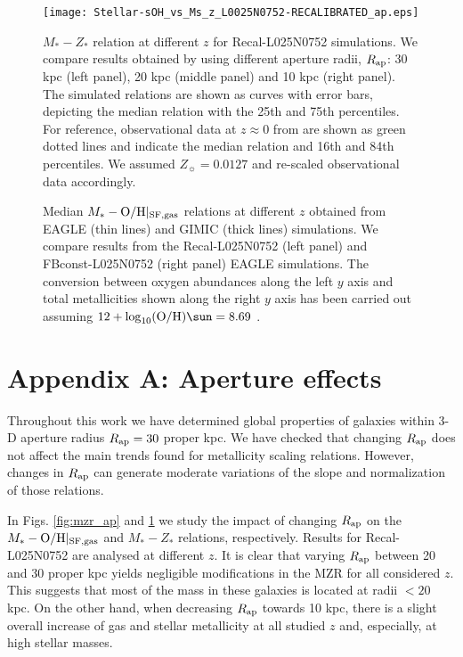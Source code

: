 \documentclass[useAMS,usenatbib]{mn2e}
\begin{document}
\begin{figure*}
\begin{center}
\resizebox{17.cm}{!}
{\texttt{[image: Stellar-sOH\_vs\_Ms\_z\_L0025N0752-RECALIBRATED\_ap.eps]}}
\end{center}
\caption[]
{
$M_* - Z_*$ relation at different $z$ for Recal-L025N0752 simulations. 
We compare results obtained by using different aperture radii, $R_{\rm ap}$: 30 kpc (left panel),
20 kpc (middle panel) and 10 kpc (right panel).
The simulated relations are shown as curves with error bars, depicting the median relation with the 25th and 75th
percentiles.  
For reference, observational data at $z\approx 0$ from \citet{gallazzi2005} are shown as
green dotted lines and indicate the median relation and 16th and 84th percentiles.
We assumed $Z_{\sun} = 0.0127$ \citep{wiersma2009b} and re-scaled observational data accordingly.
}
\label{fig:stellar_mzr_ap}
\end{figure*}


\begin{figure*}
\begin{center}
\end{center}
\caption[]
{
Median $M_* - {\rm O/H}|_{\rm SF,gas}$ relations at different $z$ obtained
from {\sc EAGLE} (thin lines) and GIMIC (thick lines) simulations. 
We compare results from the Recal-L025N0752 (left panel) and FBconst-L025N0752 (right panel)
{\sc EAGLE} simulations.
The conversion between oxygen abundances along the left $y$ axis and total metallicities
shown along the right $y$ axis has been carried out assuming
$12+ \log_{10} ({\rm O/H})\sun = 8.69$ \citep{allende2001}.
}
\label{fig:gimic_mzr}
\end{figure*}


\section*{Appendix A: Aperture effects}

Throughout this work we have determined global properties of galaxies
within 3-D aperture radius $R_{\rm ap} = 30$ proper kpc.  We have checked that changing
$R_{\rm ap}$ does not affect the main trends found for metallicity scaling relations.
However, changes in $R_{\rm ap}$ can generate moderate variations of the slope and
normalization of those relations.

In Figs. \ref{fig:mzr_ap} and \ref{fig:stellar_mzr_ap} we study the impact of 
changing $R_{\rm ap}$ on the $M_* - {\rm O/H}|_{\rm SF,gas}$ and $M_* - Z_*$ relations,
respectively.
Results for Recal-L025N0752 are analysed at different $z$. It is clear that varying $R_{\rm ap}$ between 20
and 30 proper kpc yields negligible modifications in the MZR for all considered $z$.  This suggests
that most of the mass in these galaxies is located at radii $< 20$ kpc.
On the other hand, when decreasing $R_{\rm ap}$ towards 10 kpc, 
there is a slight overall increase of gas and stellar metallicity at all studied $z$ and, especially, at high stellar masses.
\end{document}
